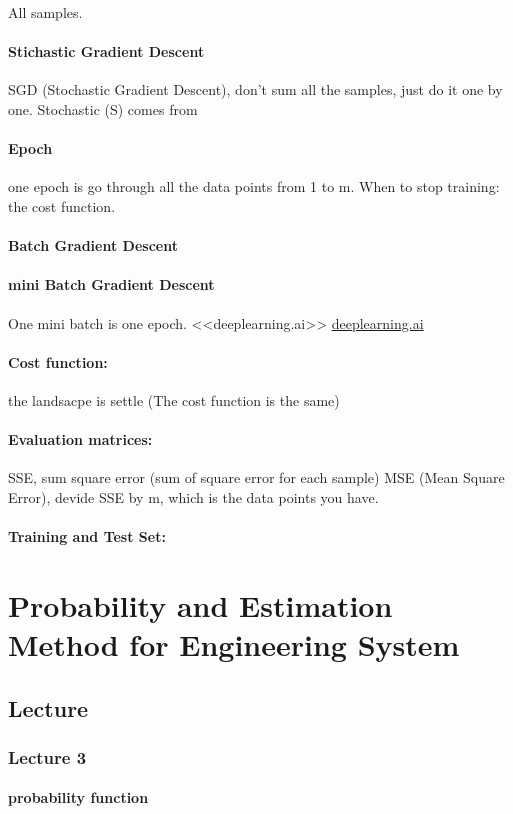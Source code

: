 \documentclass[a4paper]{article}
\begin{document}
All samples. 
\paragraph{Stichastic Gradient Descent} SGD (Stochastic Gradient Descent), don't sum all the samples, just do it one by one.
Stochastic (S) comes from 

\paragraph{Epoch} one epoch is go through all the data points from 1 to m.
When to stop training: the cost function.

\paragraph{Batch Gradient Descent}
\paragraph{mini Batch Gradient Descent}
One mini batch is one epoch. <<deeplearning.ai>> \url{deeplearning.ai} 

\paragraph{Cost function:}
the landsacpe is settle (The cost function is the same)
\paragraph{Evaluation matrices:}
SSE, sum square error (sum of square error for each sample)
MSE (Mean Square Error), devide SSE by m, which is the data points you have. 
\paragraph{Training and Test Set:}

\section{Probability and Estimation Method for Engineering System}
\subsection{Lecture}
\subsubsection{Lecture 3}
\paragraph{probability function}
\end{document}
